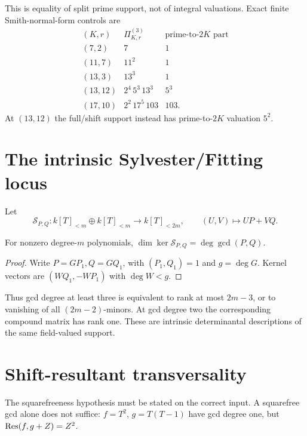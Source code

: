 This is equality of split prime support, not of integral valuations.
Exact finite Smith-normal-form controls are
\[
\begin{array}{c|c|c}
(K,r)&\Pi_{K,r}^{(3)}&\text{prime-to-}2K\text{ part}\\\hline
(7,2)&7&1\\
(11,7)&11^2&1\\
(13,3)&13^3&1\\
(13,12)&2^4\,5^3\,13^3&5^3\\
(17,10)&2^2\,17^5\,103&103.
\end{array}
\]
At $(13,12)$ the full/shift support instead has prime-to-$2K$ valuation $5^2$.

\section{The intrinsic Sylvester/Fitting locus}
Let
\[
\mathcal S_{P,Q}:k[T]_{<m}\oplus k[T]_{<m}\longrightarrow k[T]_{<2m},
\qquad (U,V)\longmapsto UP+VQ.
\]
\begin{theorem}\label{frontier:thm:nullity}
For nonzero degree-$m$ polynomials,
$\dim\ker\mathcal S_{P,Q}=\deg\gcd(P,Q)$.
\end{theorem}
\begin{proof}
Write $P=GP_1,Q=GQ_1$, with $(P_1,Q_1)=1$ and $g=\deg G$.
Kernel vectors are $(WQ_1,-WP_1)$ with $\deg W<g$.
\end{proof}
Thus gcd degree at least three is equivalent to rank at most $2m-3$, or to
vanishing of all $(2m-2)$-minors. At gcd degree two the corresponding compound
matrix has rank one. These are intrinsic determinantal descriptions of the
same field-valued support.

\section{Shift-resultant transversality}
The squarefreeness hypothesis must be stated on the correct input. A
squarefree gcd alone does not suffice: $f=T^2$, $g=T(T-1)$ have gcd degree
one, but $\operatorname{Res}(f,g+Z)=Z^2$.

